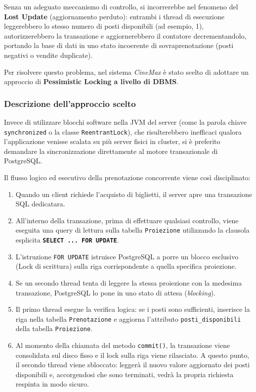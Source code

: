 \documentclass{article}
\begin{document}
Senza un adeguato meccanismo di controllo, si incorrerebbe nel fenomeno del \textbf{Lost Update} (aggiornamento perduto): entrambi i thread di esecuzione leggerebbero lo stesso numero di posti disponibili (ad esempio, 1), autorizzerebbero la transazione e aggiornerebbero il contatore decrementandolo, portando la base di dati in uno stato incoerente di sovraprenotazione (posti negativi o vendite duplicate).

Per risolvere questo problema, nel sistema \textit{CineMax} è stato scelto di adottare un approccio di \textbf{Pessimistic Locking a livello di DBMS}. 

\subsubsection{Descrizione dell'approccio scelto}
Invece di utilizzare blocchi software nella JVM del server (come la parola chiave \texttt{synchronized} o la classe \texttt{ReentrantLock}), che risulterebbero inefficaci qualora l'applicazione venisse scalata su più server fisici in cluster, si è preferito demandare la sincronizzazione direttamente al motore transazionale di PostgreSQL.

Il flusso logico ed esecutivo della prenotazione concorrente viene così disciplinato:
\begin{enumerate}
    \item Quando un client richiede l'acquisto di biglietti, il server apre una transazione SQL dedicatara.
    \item All'interno della transazione, prima di effettuare qualsiasi controllo, viene eseguita una query di lettura sulla tabella \texttt{Proiezione} utilizzando la clausola esplicita \textbf{\texttt{SELECT ... FOR UPDATE}}.
    \item L'istruzione \texttt{FOR UPDATE} istruisce PostgreSQL a porre un blocco esclusivo (Lock di scrittura) sulla riga corrispondente a quella specifica proiezione. 
    \item Se un secondo thread tenta di leggere la stessa proiezione con la medesima transazione, PostgreSQL lo pone in uno stato di attesa (\textit{blocking}).
    \item Il primo thread esegue la verifica logica: se i posti sono sufficienti, inserisce la riga nella tabella \texttt{Prenotazione} e aggiorna l'attributo \texttt{posti\_disponibili} della tabella \texttt{Proiezione}.
    \item Al momento della chiamata del metodo \texttt{commit()}, la transazione viene consolidata sul disco fisso e il lock sulla riga viene rilasciato. A questo punto, il secondo thread viene sbloccato: leggerà il nuovo valore aggiornato dei posti disponibili e, accorgendosi che sono terminati, vedrà la propria richiesta respinta in modo sicuro.
\end{enumerate}
\end{document}
